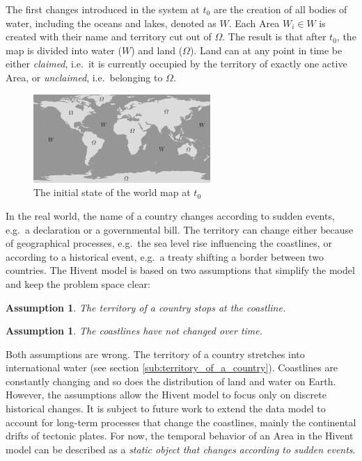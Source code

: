 The first changes introduced in the system at $t_0$ are the creation of all bodies of water, including the oceans and lakes, denoted as $W$. Each Area $W_i \in W$ is created with their name and territory cut out of $\Omega$. The result is that after $t_0$, the map is divided into water ($W$) and land ($\Omega$). Land can at any point in time be either \emph{claimed}, i.e.\ it is currently occupied by the territory of exactly one active Area, or \emph{unclaimed}, i.e.\ belonging to $\Omega$.

\begin{figure}[ht]
  \centering
  \includegraphics[width=0.6\textwidth]{graphics/development/hivent_model/init_map}
  \caption{The initial state of the world map at $t_0$}
  \label{fig:init_map}
\end{figure}

In the real world, the name of a country changes according to sudden events, e.g.\ a declaration or a governmental bill. The territory can change either because of geographical processes, e.g.\ the sea level rise influencing the coastlines, or according to a historical event, e.g.\ a treaty shifting a border between two countries. The Hivent model is based on two assumptions that simplify the model and keep the problem space clear:

\vspace{-0.0em}
\newtheorem{coastline_territory}[assicounter]{Assumption}
\begin{coastline_territory}
\label{axm:coastline_territory}
  The territory of a country stops at the coastline.
\end{coastline_territory}

\vspace{-1.5em}
\newtheorem{constant_coastlines}[assicounter]{Assumption}
\begin{constant_coastlines}
\label{axm:constant_coastlines}
  The coastlines have not changed over time.
\end{constant_coastlines}

Both assumptions are wrong. The territory of a country stretches into international water (see section \ref{sub:territory_of_a_country}). Coastlines are constantly changing and so does the distribution of land and water on Earth. However, the assumptions allow the Hivent model to focus only on discrete historical changes. It is subject to future work to extend the data model to account for long-term processes that change the coastlines, mainly the continental drifts of tectonic plates. For now, the temporal behavior of an Area in the Hivent model can be described as a \emph{static object that changes according to sudden events}.

